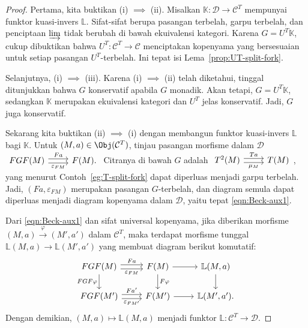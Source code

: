 \begin{proof}
	Pertama, kita buktikan (i) $\implies$ (ii). Misalkan
	$\mathbb{K}:\mathcal{D}\to\mathcal{C}^T$ mempunyai funktor kuasi-invers
	$\mathbb{L}$. Sifat-sifat berupa pasangan terbelah, garpu terbelah, dan
	penciptaan $\varinjlim$ tidak berubah di bawah ekuivalensi kategori. Karena
	$G=U^T\mathbb{K}$, cukup dibuktikan bahwa
	$U^T:\mathcal{C}^T\to\mathcal{C}$ menciptakan kopenyama yang bersesuaian
	untuk setiap pasangan $U^T$-terbelah. Ini tepat isi
	Lema~\ref{prop:UT-split-fork}.

	Selanjutnya, (i) $\implies$ (iii). Karena (i) $\implies$ (ii) telah
	diketahui, tinggal ditunjukkan bahwa $G$ konservatif apabila $G$ monadik.
	Akan tetapi, $G=U^T\mathbb{K}$, sedangkan $\mathbb{K}$ merupakan
	ekuivalensi kategori dan $U^T$ jelas konservatif. Jadi, $G$ juga
	konservatif.

	Sekarang kita buktikan (ii) $\implies$ (i) dengan membangun funktor kuasi-invers
	$\mathbb{L}$ bagi $\mathbb{K}$. Untuk
	$(M,a)\in\Obj(\mathcal{C}^T)$, tinjau pasangan morfisme dalam
	$\mathcal{D}$
	$\begin{tikzcd}
		FGF(M) \arrow[shift left, r, "Fa"] \arrow[shift right, r, "\varepsilon_{FM}"'] & F(M).
	\end{tikzcd}$
	Citranya di bawah $G$ adalah
	$\begin{tikzcd}
		T^2(M) \arrow[shift left, r, "Ta"] \arrow[shift right, r, "\mu_M"'] & T(M)
	\end{tikzcd}$\!,
	yang menurut Contoh~\ref{eg:T-split-fork} dapat diperluas menjadi garpu
	terbelah. Jadi, $(Fa,\varepsilon_{FM})$ merupakan pasangan $G$-terbelah,
	dan diagram semula dapat diperluas menjadi diagram kopenyama dalam
	$\mathcal{D}$, yaitu tepat \eqref{eqn:Beck-aux1}.

	Dari \eqref{eqn:Beck-aux1} dan sifat universal kopenyama, jika diberikan
	morfisme $(M,a)\xrightarrow{\varphi}(M',a')$ dalam $\mathcal{C}^T$, maka
	terdapat morfisme tunggal
	$\mathbb{L}(M,a)\to\mathbb{L}(M',a')$ yang membuat diagram berikut
	komutatif:
	\begin{equation*}\begin{tikzcd}
		FGF(M) \arrow[shift left, r, "Fa"] \arrow[shift right, r, "\varepsilon_{FM}"'] \arrow[d, "FGF\varphi"'] & F(M) \arrow[r] \arrow[d, "F\varphi"] & \mathbb{L}(M, a) \arrow[d] \\
		FGF(M') \arrow[shift left, r, "{Fa'}"] \arrow[shift right, r, "\varepsilon_{FM'}"'] & F(M') \arrow[r] & \mathbb{L}(M', a').
	\end{tikzcd}\end{equation*}
	Dengan demikian, $(M,a)\mapsto\mathbb{L}(M,a)$ menjadi funktor
	$\mathbb{L}:\mathcal{C}^T\to\mathcal{D}$.


\end{proof}
